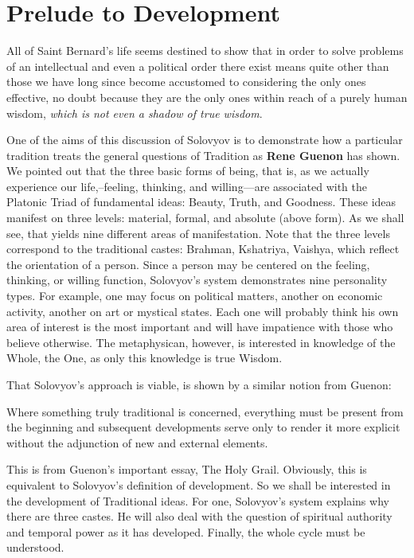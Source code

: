 \section{Prelude to Development}

\begin{quotex}
All of Saint Bernard's life seems destined to show that in order to solve problems of an intellectual and even a political order there exist means quite other than those we have long since become accustomed to considering the only ones effective, no doubt because they are the only ones within reach of a purely human wisdom, \emph{which is not even a shadow of true wisdom}.
\end{quotex}


One of the aims of this discussion of Solovyov is to demonstrate how a particular tradition treats the general questions of Tradition as \textbf{Rene Guenon} has shown. We pointed out that the three basic forms of being, that is, as we actually experience our life,--feeling, thinking, and willing---are associated with the Platonic Triad of fundamental ideas: Beauty, Truth, and Goodness. These ideas manifest on three levels: material, formal, and absolute (above form). As we shall see, that yields nine different areas of manifestation. Note that the three levels correspond to the traditional castes: Brahman, Kshatriya, Vaishya, which reflect the orientation of a person. Since a person may be centered on the feeling, thinking, or willing function, Solovyov's system demonstrates nine personality types. For example, one may focus on political matters, another on economic activity, another on art or mystical states. Each one will probably think his own area of interest is the most important and will have impatience with those who believe otherwise. The metaphysican, however, is interested in knowledge of the Whole, the One, as only this knowledge is true Wisdom.

That Solovyov's approach is viable, is shown by a similar notion from Guenon:

\begin{quotex}
Where something truly traditional is concerned, everything must be present from the beginning and subsequent developments serve only to render it more explicit without the adjunction of new and external elements.
\end{quotex}


This is from Guenon's important essay, The Holy Grail. Obviously, this is equivalent to Solovyov's definition of development. So we shall be interested in the development of Traditional ideas. For one, Solovyov's system explains why there are three castes. He will also deal with the question of spiritual authority and temporal power as it has developed. Finally, the whole cycle must be understood.

